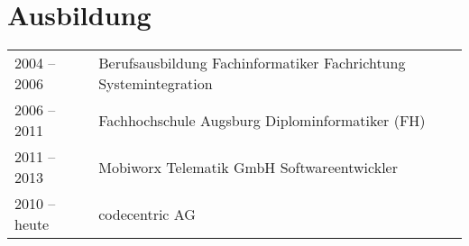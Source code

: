 \section*{Ausbildung}
\begin{tabular}{@{}p{6cm}p{10cm}}
2004 -- 2006	& Berufsausbildung Fachinformatiker
	Fachrichtung Systemintegration\\
2006 -- 2011	& Fachhochschule Augsburg
	Diplominformatiker (FH)\\
2011 -- 2013	& Mobiworx Telematik GmbH
	Softwareentwickler\\
2010 -- heute	& codecentric AG
\end{tabular}
